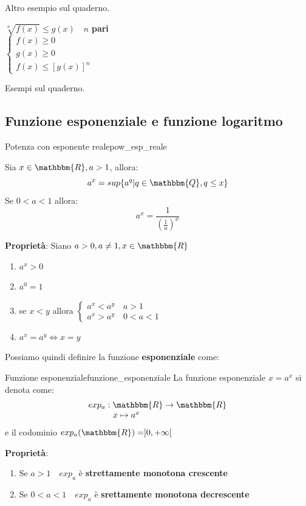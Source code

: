 \documentclass[12pt]{report}
\newcounter{definition}
\newcommand{\nmu}{}
\begin{document}
	Altro esempio sul quaderno.
	\begin{note}{}{}
		$\sqrt[n]{f(x)} \leq g(x) \quad n$ \textbf{pari} \\
		$\begin{cases}
			f(x) \geq 0 \\
			g(x) \geq 0 \\
			f(x) \leq [g(x)]^n
		\end{cases}$
	\end{note}
	Esempi sul quaderno.
	\subsection{Funzione esponenziale e funzione logaritmo}
	\begin{definition}{\nmu Potenza con esponente reale}{pow_esp_reale}

		Sia $x \in \mathbbm{R}, a > 1$, allora:
		\[a^x = sup\{a^q | q \in \mathbbm{Q}, q \leq x\}\]
		Se $0 < a < 1$ allora:
		\[a^x = \frac{1}{(\frac{1}{a})^x}\]
	\end{definition}
	\textbf{Proprietà}: Siano $a>0, a \neq 1, x \in \mathbbm{R}$
	\begin{enumerate}
		\item $a^x > 0$
		\item $a^0=1$
		\item se $x < y$ allora $\begin{cases}
			a^x < a^y \quad a > 1 \\
			a^x > a^y \quad 0 < a < 1
		\end{cases}$
		\item $a^x = a^y \iff x = y$
	\end{enumerate}
	Possiamo quindi definire la funzione \textbf{esponenziale} come:
	\begin{definition}{\nmu Funzione esponenziale}{funzione_esponenziale}
		La funzione esponenziale $x = a^x$ si denota come:
		\[
		\begin{array}{l}
			exp_a: \mathbbm{R} \to \mathbbm{R} \\
			\phantom{exp_a:\ }x \mapsto a^x
		\end{array}
		\]
		e il codominio $exp_a(\mathbbm{R}) = ]0, +\infty[$
	\end{definition}
	\textbf{Proprietà}:
	\begin{enumerate}
		\item Se $a>1 \quad exp_a$ è \textbf{strettamente monotona crescente}
		\item Se $0<a<1 \quad exp_a$ è \textbf{srettamente monotona decrescente}
	\end{enumerate}
\end{document}
